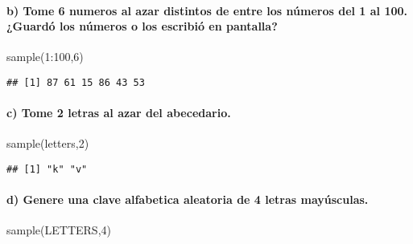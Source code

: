 \documentclass[
]{article}
\newenvironment{Shaded}{\begin{snugshade}}{\end{snugshade}}
\newcommand{\DecValTok}[1]{\textcolor[rgb]{0.00,0.00,0.81}{#1}}
\newcommand{\FunctionTok}[1]{\textcolor[rgb]{0.00,0.00,0.00}{#1}}
\newcommand{\NormalTok}[1]{#1}
\newcommand{\SpecialCharTok}[1]{\textcolor[rgb]{0.00,0.00,0.00}{#1}}
\begin{document}
\hypertarget{b-tome-6-numeros-al-azar-distintos-de-entre-los-nuxfameros-del-1-al-100.-guarduxf3-los-nuxfameros-o-los-escribiuxf3-en-pantalla}{%
\paragraph{b) Tome 6 numeros al azar distintos de entre los números del
1 al 100. ¿Guardó los números o los escribió en
pantalla?}\label{b-tome-6-numeros-al-azar-distintos-de-entre-los-nuxfameros-del-1-al-100.-guarduxf3-los-nuxfameros-o-los-escribiuxf3-en-pantalla}}

\begin{Shaded}
\begin{Highlighting}[]
\FunctionTok{sample}\NormalTok{(}\DecValTok{1}\SpecialCharTok{:}\DecValTok{100}\NormalTok{,}\DecValTok{6}\NormalTok{)}
\end{Highlighting}
\end{Shaded}

\begin{verbatim}
## [1] 87 61 15 86 43 53
\end{verbatim}

\hypertarget{c-tome-2-letras-al-azar-del-abecedario.}{%
\paragraph{c) Tome 2 letras al azar del
abecedario.}\label{c-tome-2-letras-al-azar-del-abecedario.}}

\begin{Shaded}
\begin{Highlighting}[]
\FunctionTok{sample}\NormalTok{(letters,}\DecValTok{2}\NormalTok{)}
\end{Highlighting}
\end{Shaded}

\begin{verbatim}
## [1] "k" "v"
\end{verbatim}

\hypertarget{d-genere-una-clave-alfabetica-aleatoria-de-4-letras-mayuxfasculas.}{%
\paragraph{d) Genere una clave alfabetica aleatoria de 4 letras
mayúsculas.}\label{d-genere-una-clave-alfabetica-aleatoria-de-4-letras-mayuxfasculas.}}

\begin{Shaded}
\begin{Highlighting}[]
\FunctionTok{sample}\NormalTok{(LETTERS,}\DecValTok{4}\NormalTok{)}
\end{Highlighting}
\end{Shaded}
\end{document}
